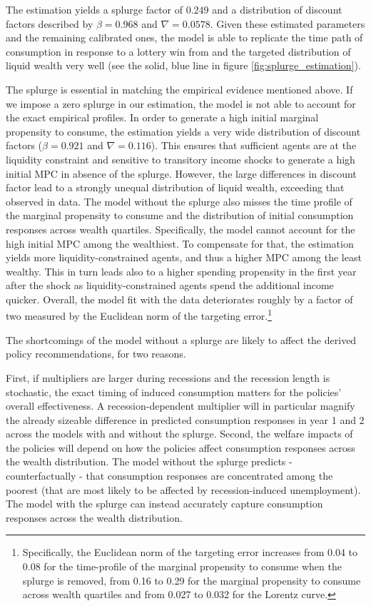 \documentclass[\econtexRoot/HAFiscal]{subfiles}
\begin{document}
The estimation yields a splurge factor of $0.249$ and a distribution of discount factors described by $\beta = 0.968$ and $\nabla=0.0578$.
Given these estimated parameters and the remaining calibrated ones, the model is able to replicate the time path of consumption in response to a lottery win from \citet{fagereng_mpc_2021} and the targeted distribution of liquid wealth very well (see the solid, blue line in figure \ref{fig:splurge_estimation}).

The splurge is essential in matching the empirical evidence mentioned above.
If we impose a zero splurge in our estimation, the model is not able to account for the exact empirical profiles.
In order to generate a high initial marginal propensity to consume, the estimation yields a very wide distribution of discount factors ($\beta = 0.921$ and $\nabla=0.116$).
This ensures that sufficient agents are at the liquidity constraint and sensitive to transitory income shocks to generate a high initial MPC in absence of the splurge.
However, the large differences in discount factor lead to a strongly unequal distribution of liquid wealth, exceeding that observed in data.
The model without the splurge also misses the time profile of the marginal propensity to consume and the distribution of initial consumption responses across wealth quartiles.
Specifically, the model cannot account for the high initial MPC among the wealthiest.
To compensate for that, the estimation yields more liquidity-constrained agents, and thus a higher MPC among the least wealthy.
This in turn leads also to a higher spending propensity in the first year after the shock as liquidity-constrained agents spend the additional income quicker.
Overall, the model fit with the data deteriorates roughly by a factor of two measured by the Euclidean norm of the targeting error.\footnote{Specifically, the Euclidean norm of the targeting error increases from 0.04 to 0.08 for the time-profile of the marginal propensity to consume when the splurge is removed, from 0.16 to 0.29 for the marginal propensity to consume across wealth quartiles and from 0.027 to 0.032 for the Lorentz curve.}

The shortcomings of the model without a splurge are likely to affect the derived policy recommendations, for two reasons.

First, if multipliers are larger during recessions and the recession length is stochastic, the exact timing of induced consumption matters for the policies' overall effectiveness.
A recession-dependent multiplier will in particular magnify the already sizeable difference in predicted consumption responses in year 1 and 2 across the models with and without the splurge.
Second, the welfare impacts of the policies will depend on how the policies affect consumption responses across the wealth distribution.
The model without the splurge predicts - counterfactually - that consumption responses are concentrated among the poorest (that are most likely to be affected by recession-induced unemployment).
The model with the splurge can instead accurately capture consumption responses across the wealth distribution.
\end{document}
